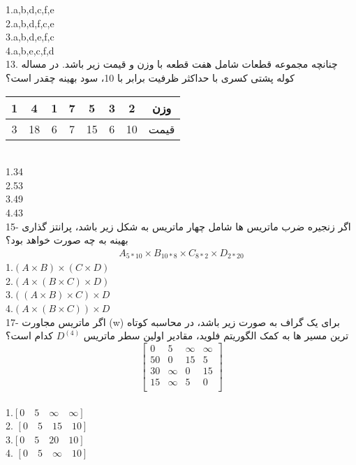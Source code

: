 \documentclass{book}
\begin{document}
1.a,b,d,c,f,e \\
2.a,b,d,f,c,e \\
3.a,b,d,e,f,c \\
4.a,b,e,c,f,d \\

13. چنانچه مجموعه قطعات شامل هفت قطعه با وزن و قیمت زیر باشد. در مساله کوله پشتی کسری با حداکثر ظرفیت برابر با 10، سود بهینه چقدر است؟\\
\begin{table}[htp]
\renewcommand{\arraystretch}{1.5}
\begin{tabular}{|c|c|c|c|c|c|c|c|}
\hline
 1 & 4 & 1 & 7 & 5 & 3 & 2 & وزن \\ \hline
\hline
 3 & 18 & 6 & 7 & 15 & 6 & 10 & قیمت \\ \hline
\end{tabular}
\end{table}
\\

1.34 \\ 2.53 \\ 3.49\\ 4.43\\

15- اگر زنجیره ضرب ماتریس ها شامل چهار ماتریس به شکل زیر باشد، پرانتز گذاری بهینه به چه صورت خواهد بود؟
\begin{align*}
A_{5*10} \times B_{10*8} \times C_{8*2} \times D_{2*20}
\end{align*}
1.$(A\times B)\times(C\times D)$  \\ 2.$(A\times (B\times C)\times D)$\\3.$((A\times B)\times C)\times D$\\4.$(A\times (B\times C))\times D$  \\ 

17- اگر ماتریس مجاورت (w) برای یک گراف به صورت زیر باشد، در محاسبه کوتاه ترین مسیر ها به کمک الگوریتم فلوید، مقادیر اولین سطر ماتریس $D^{(4)}$ کدام است؟\\
\[
\begin{bmatrix}
  0 & 5 & \infty & \infty    \\
  50 & 0 & 15 & 5    \\
  30 & \infty & 0 & 15   \\
  15 & \infty & 5 & 0    \\
\end{bmatrix}
\] 
\\
1.$[0 \quad 5 \quad \infty \quad \infty ]$ \\ 2. $[0 \quad 5 \quad 15 \quad 10]$ \\ 3.$ [0 \quad 5 \quad 20 \quad10 ]$ \\ 4. $[0 \quad 5 \quad \infty \quad 10 ]$\\
\end{document}
